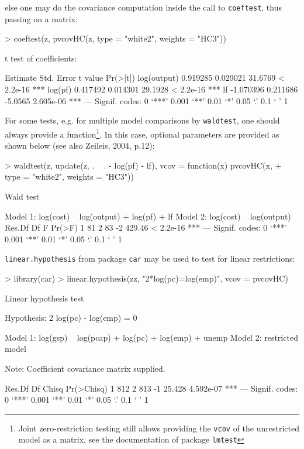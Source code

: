 \documentclass{article}
\begin{document}
else one may do the covariance computation inside the call to \texttt{coeftest}, thus passing on a matrix:

\begin{Schunk}
\begin{Sinput}
> coeftest(z, pvcovHC(z, type = "white2", weights = "HC3"))
\end{Sinput}
\begin{Soutput}
t test of coefficients:

             Estimate Std. Error t value  Pr(>|t|)    
log(output)  0.919285   0.029021 31.6769 < 2.2e-16 ***
log(pf)      0.417492   0.014301 29.1928 < 2.2e-16 ***
lf          -1.070396   0.211686 -5.0565 2.605e-06 ***
---
Signif. codes:  0 ‘***’ 0.001 ‘**’ 0.01 ‘*’ 0.05 ‘.’ 0.1 ‘ ’ 1 
\end{Soutput}
\end{Schunk}

For some tests, e.g. for multiple model comparisons by \texttt{waldtest}, one should always provide a function\footnote{Joint zero-restriction testing still allows providing the \texttt{vcov} of the unrestricted model as a matrix, see the documentation of package \texttt{lmtest}}. In this case, optional parameters are provided as shown below (see also Zeileis, 2004, p.12):

\begin{Schunk}
\begin{Sinput}
> waldtest(z, update(z, . ~ . - log(pf) - lf), vcov = function(x) pvcovHC(x, 
+     type = "white2", weights = "HC3"))
\end{Sinput}
\begin{Soutput}
Wald test

Model 1: log(cost) ~ log(output) + log(pf) + lf
Model 2: log(cost) ~ log(output)
  Res.Df Df      F    Pr(>F)    
1     81                        
2     83 -2 429.46 < 2.2e-16 ***
---
Signif. codes:  0 ‘***’ 0.001 ‘**’ 0.01 ‘*’ 0.05 ‘.’ 0.1 ‘ ’ 1 
\end{Soutput}
\end{Schunk}

\texttt{linear.hypothesis} from package \texttt{car} may be used to test for linear restrictions:

\begin{Schunk}
\begin{Sinput}
> library(car)
> linear.hypothesis(zz, "2*log(pc)=log(emp)", vcov = pvcovHC)
\end{Sinput}
\begin{Soutput}
Linear hypothesis test

Hypothesis:
2 log(pc) - log(emp) = 0

Model 1: log(gsp) ~ log(pcap) + log(pc) + log(emp) + unemp
Model 2: restricted model

Note: Coefficient covariance matrix supplied.

  Res.Df  Df  Chisq Pr(>Chisq)    
1    812                          
2    813  -1 25.428  4.592e-07 ***
---
Signif. codes:  0 ‘***’ 0.001 ‘**’ 0.01 ‘*’ 0.05 ‘.’ 0.1 ‘ ’ 1 
\end{Soutput}
\end{Schunk}
\end{document}
